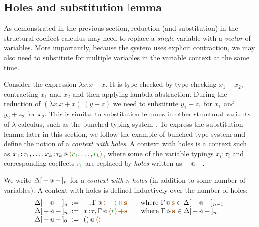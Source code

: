 \subsection{Holes and substitution lemma}
\label{sec:struct-syntactic-subst}

As demonstrated in the previous section, reduction (and substitution) in the structural coeffect
calculus may need to replace a \emph{single} variable with a \emph{vector} of variables.
More importantly, because the system uses explicit contraction, we may also need to substitute
for multiple variables in the variable context at the same time.

Consider the expression $\lambda x.x+x$. It is type-checked by type-checking $x_1 + x_2$,
contracting $x_1$ and $x_2$ and then applying lambda abstraction. During the reduction of
$(\lambda x.x+x)~(y+z)$ we need to substitute $y_1+z_1$ for $x_1$ and $y_2+z_2$ for $x_2$.
This is similar to substitution lemmas in other structural variants of $\lambda$-calculus,
such as the bunched typing system \cite{substruct-bunched}. To express the substitution
lemma later in this section, we follow the example of bunched type system and define the
notion of a \emph{context with holes}. A context with holes is a context such as
$\coctx{x_1\!:\!\tau_1, \ldots, x_k\!:\!\tau_k}{\alift{\cclrd{r_1}, \ldots, \cclrd{r_k}}}$,
where some of the variable typings $x_i\!:\!\tau_i$ and corresponding coeffects $\cclrd{r_i}$
are replaced by \emph{holes} written as $\coctx{-}{-}$.

\begin{definition}
We write $\Delta[\,\coctx{-}{-}\,]_n$ for a \emph{context with $n$ holes} (in addition to some
number of variables). A context with holes is defined inductively over the number of holes:
%
\begin{equation*}
\begin{array}{lcl}
 \Delta[\,\coctx{-}{-}\,]_n &\narrow{:=}&
   \coctx{-, \Gamma}{\alift{-} \atimes \aclrd{\textbf{s}} }
   \qquad \textnormal{where}~\coctx{\Gamma}{\aclrd{\textbf{s}}} \in \Delta[\,\coctx{-}{-}\,]_{n-1} \\
 \Delta[\,\coctx{-}{-}\,]_n &\narrow{:=}&
   \coctx{x\!:\!\tau, \Gamma}{\alift{\cclrd{r}} \atimes \aclrd{\textbf{s}} }
   \qquad \textnormal{where}~\coctx{\Gamma}{\aclrd{\textbf{s}}} \in \Delta[\,\coctx{-}{-}\,]_n \\
 \Delta[\,\coctx{-}{-}\,]_0 &\narrow{:=}&
   \coctx{()}{\alift{}}
\end{array}
\end{equation*}
\end{definition}

